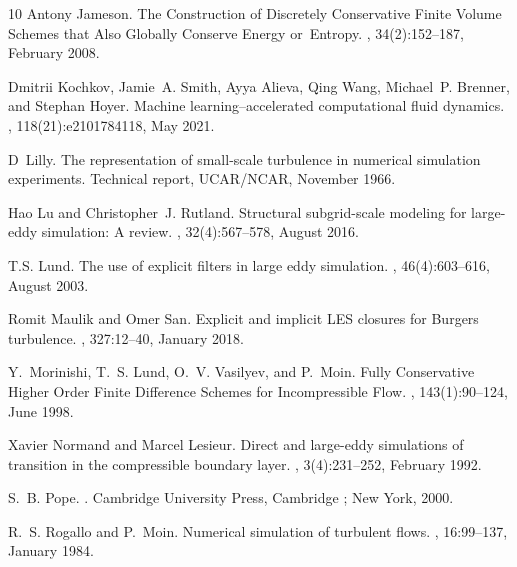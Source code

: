 \documentclass[preprint,twocolumn,5p]{elsarticle}
\begin{document}
\begin{thebibliography}{10}
Antony Jameson.
\newblock The {{Construction}} of {{Discretely Conservative Finite Volume Schemes}} that {{Also Globally Conserve Energy}} or~{{Entropy}}.
, 34(2):152--187, February 2008.

Dmitrii Kochkov, Jamie~A. Smith, Ayya Alieva, Qing Wang, Michael~P. Brenner, and Stephan Hoyer.
\newblock Machine learning--accelerated computational fluid dynamics.
, 118(21):e2101784118, May 2021.

D~Lilly.
\newblock The representation of small-scale turbulence in numerical simulation experiments.
\newblock Technical report, UCAR/NCAR, November 1966.

Hao Lu and Christopher~J. Rutland.
\newblock Structural subgrid-scale modeling for large-eddy simulation: {{A}} review.
, 32(4):567--578, August 2016.

T.S. Lund.
\newblock The use of explicit filters in large eddy simulation.
, 46(4):603--616, August 2003.

Romit Maulik and Omer San.
\newblock Explicit and implicit {{LES}} closures for {{Burgers}} turbulence.
, 327:12--40, January 2018.

Y.~Morinishi, T.~S. Lund, O.~V. Vasilyev, and P.~Moin.
\newblock Fully {{Conservative Higher Order Finite Difference Schemes}} for {{Incompressible Flow}}.
, 143(1):90--124, June 1998.

Xavier Normand and Marcel Lesieur.
\newblock Direct and large-eddy simulations of transition in the compressible boundary layer.
, 3(4):231--252, February 1992.

S.~B. Pope.
.
\newblock Cambridge University Press, Cambridge ; New York, 2000.

R.~S. Rogallo and P.~Moin.
\newblock Numerical simulation of turbulent flows.
, 16:99--137, January 1984.


\end{thebibliography}
\end{document}
